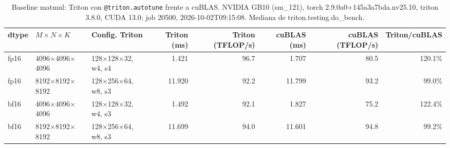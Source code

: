 \begin{table}[htbp]
  \centering\small
  \begin{tabular}{lllrrrrr}
    \toprule
    dtype & $M \times N \times K$ & Config. Triton & Triton (ms) & Triton (TFLOP/s) & cuBLAS (ms) & cuBLAS (TFLOP/s) & Triton/cuBLAS \\
    \midrule
    fp16 & 4096$\times$4096$\times$4096 & 128$\times$128$\times$32, w4, s4 & 1.421 & 96.7 & 1.707 & 80.5 & 120.1\% \\
    fp16 & 8192$\times$8192$\times$8192 & 128$\times$256$\times$64, w8, s3 & 11.920 & 92.2 & 11.799 & 93.2 & 99.0\% \\
    bf16 & 4096$\times$4096$\times$4096 & 128$\times$128$\times$32, w4, s3 & 1.492 & 92.1 & 1.827 & 75.2 & 122.4\% \\
    bf16 & 8192$\times$8192$\times$8192 & 128$\times$256$\times$64, w8, s3 & 11.699 & 94.0 & 11.601 & 94.8 & 99.2\% \\
    \bottomrule
  \end{tabular}
  \caption{Baseline matmul: Triton con \texttt{@triton.autotune} frente a cuBLAS. NVIDIA GB10 (sm\_121), torch 2.9.0a0+145a3a7bda.nv25.10, triton 3.8.0, CUDA 13.0; job 20500, 2026-10-02T09:15:08. Mediana de triton.testing.do\_bench.}
  \label{tab:baseline-matmul}
\end{table}
